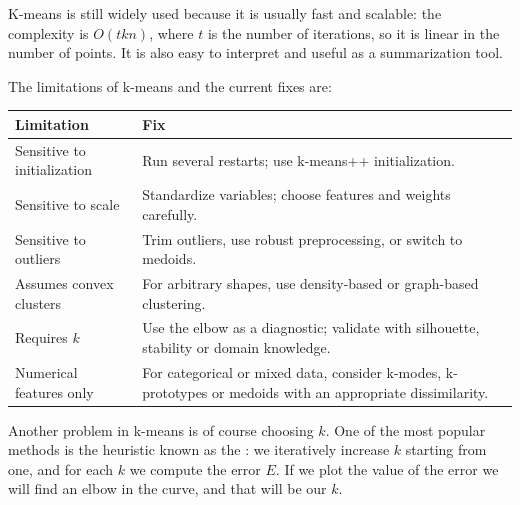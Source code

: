 K-means is still widely used because it is usually fast and scalable: the complexity is $O(tkn)$, where $t$ is the number of iterations, so it is linear in the number of points. It is also easy to interpret and useful as a summarization tool.

The limitations of k-means and the current fixes are:
\begin{center}
\begin{tabular}{@{}p{4.2cm}p{11cm}@{}}
\toprule
Limitation & Fix \\
\midrule
Sensitive to initialization & Run several restarts; use k-means++ initialization. \\
Sensitive to scale & Standardize variables; choose features and weights carefully. \\
Sensitive to outliers & Trim outliers, use robust preprocessing, or switch to medoids. \\
Assumes convex clusters & For arbitrary shapes, use density-based or graph-based clustering. \\
Requires $k$ & Use the elbow as a diagnostic; validate with silhouette, stability or domain knowledge. \\
Numerical features only & For categorical or mixed data, consider k-modes, k-prototypes or medoids with an appropriate dissimilarity. \\
\bottomrule
\end{tabular}
\end{center}

Another problem in k-means is of course choosing $k$. One of the most popular methods is the heuristic known as the : we iteratively increase $k$ starting from one, and for each $k$ we compute the error $E$. If we plot the value of the error we will find an elbow in the curve, and that will be our $k$.

\begin{center}
\end{center}

